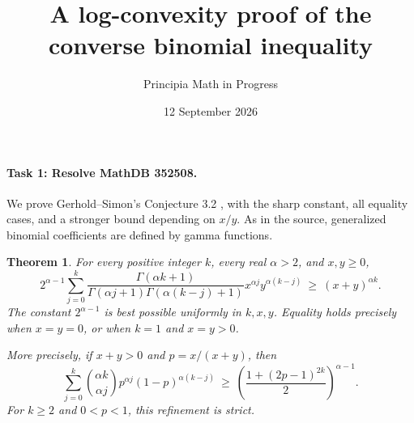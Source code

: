 \documentclass[11pt]{article}
\title{A log-convexity proof of the\\converse binomial inequality}
\author{Principia Math in Progress}
\date{12 September 2026}
\newtheorem{theorem}{Theorem}
\begin{document}
\maketitle

\paragraph{Task 1: Resolve MathDB 352508.}
We prove Gerhold--Simon's Conjecture 3.2 \cite{GS}, with the sharp
constant, all equality cases, and a stronger bound depending on \(x/y\).
As in the source, generalized binomial coefficients are defined by gamma
functions.

\begin{theorem}\label{thm:main}
For every positive integer \(k\), every real \(\alpha>2\), and \(x,y\geq0\),
\begin{equation}\label{eq:main}
 2^{\alpha-1}\sum_{j=0}^k
 \frac{\Gamma(\alpha k+1)}
      {\Gamma(\alpha j+1)\Gamma(\alpha(k-j)+1)}
 x^{\alpha j}y^{\alpha(k-j)}
 \ \geq\ (x+y)^{\alpha k}.
\end{equation}
The constant \(2^{\alpha-1}\) is best possible uniformly in \(k,x,y\).
Equality holds precisely when \(x=y=0\), or when \(k=1\) and \(x=y>0\).

More precisely, if \(x+y>0\) and \(p=x/(x+y)\), then
\begin{equation}\label{eq:refined}
 \sum_{j=0}^k\binom{\alpha k}{\alpha j}
       p^{\alpha j}(1-p)^{\alpha(k-j)}
 \ \geq\
 \left(\frac{1+(2p-1)^{2k}}2\right)^{\alpha-1}.
\end{equation}
For \(k\geq2\) and \(0<p<1\), this refinement is strict.
\end{theorem}
\end{document}
